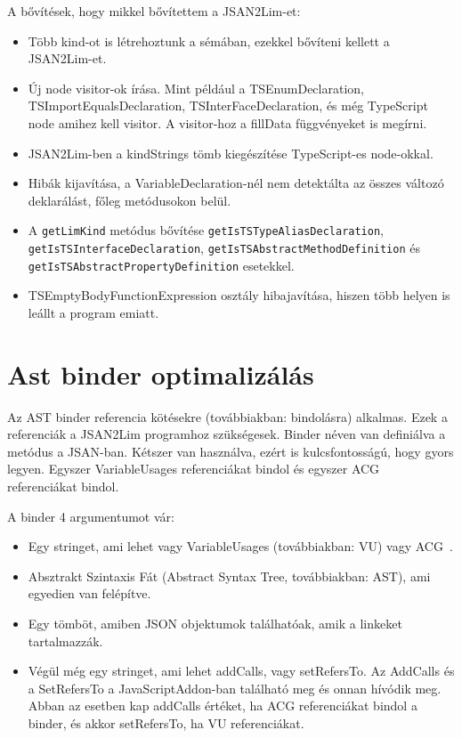 A bővítések, hogy mikkel bővítettem a JSAN2Lim-et:
\begin{itemize}
      \item Több kind-ot is létrehoztunk a sémában, ezekkel bővíteni kellett a JSAN2Lim-et.
      \item Új node visitor-ok írása. Mint például a TSEnumDeclaration, TSImportEqualsDeclaration, TSInterFaceDeclaration, és még TypeScript node amihez kell visitor.
      A visitor-hoz a fillData függvényeket is megírni.
      \item JSAN2Lim-ben a kindStrings tömb kiegészítése TypeScript-es node-okkal.
      \item Hibák kijavítása, a VariableDeclaration-nél nem detektálta az összes változó deklarálást, főleg metódusokon belül.
      \item A \texttt{getLimKind} metódus bővítése \texttt{getIsTSTypeAliasDeclaration}, \texttt{getIsTSInterfaceDeclaration},
      \texttt{getIsTSAbstractMethodDefinition} és \texttt{getIsTSAbstractPropertyDefinition} esetekkel.
      \item TSEmptyBodyFunctionExpression osztály hibajavítása, hiszen több helyen is leállt a program emiatt.
\end{itemize}

\section{Ast binder optimalizálás}

\noindent

Az AST binder referencia kötésekre (továbbiakban: bindolásra) alkalmas. Ezek a referenciák a JSAN2Lim programhoz szükségesek.
Binder néven van definiálva a metódus a JSAN-ban.
Kétszer van használva, ezért is kulcsfontosságú, hogy gyors legyen.
Egyszer VariableUsages referenciákat bindol és egyszer ACG~\cite{feldthaus2013efficient}  referenciákat bindol.

\noindent

A binder 4 argumentumot vár:

\begin{itemize}
      \item Egy stringet, ami lehet vagy VariableUsages (továbbiakban: VU) vagy ACG~\cite{feldthaus2013efficient}.
      \item Absztrakt Szintaxis Fát (Abstract Syntax Tree, továbbiakban: AST), ami egyedien van felépítve.
      \item Egy tömböt, amiben JSON objektumok találhatóak, amik a linkeket tartalmazzák.
      \item Végül még egy stringet, ami lehet addCalls, vagy setRefersTo. Az AddCalls és a SetRefersTo a JavaScriptAddon-ban található meg és onnan hívódik meg.
      Abban az esetben kap addCalls értéket, ha ACG  referenciákat bindol a binder, és akkor setRefersTo, ha VU referenciákat.
\end{itemize}

